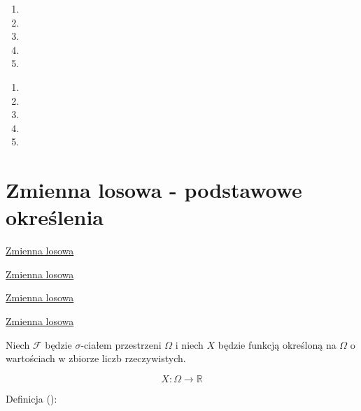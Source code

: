 \documentclass[
  letterpaper,
  DIV=11,
  numbers=noendperiod]{scrreprt}
\providecommand{\tightlist}{%
  \setlength{\itemsep}{0pt}\setlength{\parskip}{0pt}}\usepackage{longtable,booktabs,array}
\begin{document}
\begin{enumerate}
\def\labelenumi{\arabic{enumi}.}
\tightlist
\item
\item
\item
\item
\item
\end{enumerate}

\begin{tcolorbox}[enhanced jigsaw, toprule=.15mm, title={Pytania testowe}, breakable, coltitle=black, titlerule=0mm, colbacktitle=quarto-callout-important-color!10!white, opacitybacktitle=0.6, opacityback=0, bottomtitle=1mm, left=2mm, arc=.35mm, leftrule=.75mm, bottomrule=.15mm, rightrule=.15mm, toptitle=1mm, colframe=quarto-callout-important-color-frame, colback=white]

\end{tcolorbox}

\begin{enumerate}
\def\labelenumi{\arabic{enumi}.}
\tightlist
\item
\item
\item
\item
\item
\end{enumerate}


\chapter{Zmienna losowa - podstawowe
określenia}\label{zmienna-losowa---podstawowe-okreux15blenia}

\href{https://www.edukator.pl/resources/page/zmienna-losowa/790}{Zmienna
losowa}

\href{https://theta.edu.pl/wp-content/uploads/2014/02/W2EP-1.pdf}{Zmienna
losowa}

\href{https://home.agh.edu.pl/~zak/downloads/Stat-3.pdf}{Zmienna losowa}

\href{https://www.math.uni.wroc.pl/~mbogdan/Podstawy/Wyklady/wyklad_3.pdf}{Zmienna
losowa}

Niech \(\mathcal{F}\) będzie \(\sigma\)-ciałem przestrzeni \(\Omega\) i
niech \(X\) będzie funkcją określoną na \(\Omega\) o wartościach w
zbiorze liczb rzeczywistych.

\[ X: \Omega \to \mathbb{R}\]

Definicja ():
\end{document}
